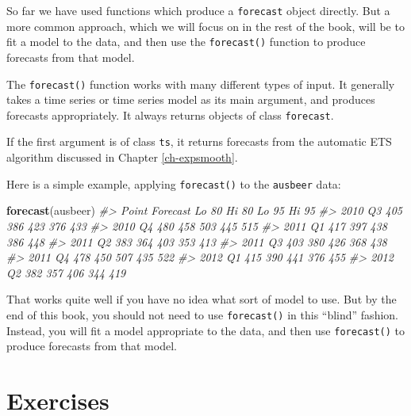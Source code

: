 \documentclass[]{book}
\newenvironment{Shaded}{\begin{snugshade}}{\end{snugshade}}
\newcommand{\CommentTok}[1]{\textcolor[rgb]{0.56,0.35,0.01}{\textit{#1}}}
\newcommand{\KeywordTok}[1]{\textcolor[rgb]{0.13,0.29,0.53}{\textbf{#1}}}
\newcommand{\NormalTok}[1]{#1}
\begin{document}
So far we have used functions which produce a \texttt{forecast} object directly. But a more common approach, which we will focus on in the rest of the book, will be to fit a model to the data, and then use the \texttt{forecast()} function to produce forecasts from that model.

The \texttt{forecast()} function works with many different types of input. It generally takes a time series or time series model as its main argument, and produces forecasts appropriately. It always returns objects of class \texttt{forecast}.

If the first argument is of class \texttt{ts}, it returns forecasts from the automatic ETS algorithm discussed in Chapter \ref{ch-expsmooth}.

Here is a simple example, applying \texttt{forecast()} to the \texttt{ausbeer} data:

\begin{Shaded}
\begin{Highlighting}[]
\KeywordTok{forecast}\NormalTok{(ausbeer)}
\CommentTok{#>         Point Forecast Lo 80 Hi 80 Lo 95 Hi 95}
\CommentTok{#> 2010 Q3            405   386   423   376   433}
\CommentTok{#> 2010 Q4            480   458   503   445   515}
\CommentTok{#> 2011 Q1            417   397   438   386   448}
\CommentTok{#> 2011 Q2            383   364   403   353   413}
\CommentTok{#> 2011 Q3            403   380   426   368   438}
\CommentTok{#> 2011 Q4            478   450   507   435   522}
\CommentTok{#> 2012 Q1            415   390   441   376   455}
\CommentTok{#> 2012 Q2            382   357   406   344   419}
\end{Highlighting}
\end{Shaded}

That works quite well if you have no idea what sort of model to use. But by the end of this book, you should not need to use \texttt{forecast()} in this ``blind'' fashion. Instead, you will fit a model appropriate to the data, and then use \texttt{forecast()} to produce forecasts from that model.

\hypertarget{ex-toolbox}{%
\section{Exercises}\label{ex-toolbox}}
\end{document}
